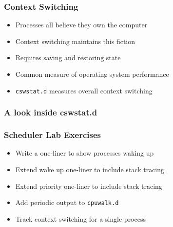 \documentclass[pdftex]{beamer}
\begin{document}
\begin{frame}[fragile]
  \frametitle{Context Switching}
  \begin{itemize}
  \item Processes all believe they own the computer
  \item Context switching maintains this fiction
  \item Requires saving and restoring state
  \item Common measure of operating system performance
  \item \verb+cswstat.d+ measures overall context switching
  \end{itemize}
\end{frame}

\begin{frame}
  \frametitle{A look inside cswstat.d}
  
\end{frame}

\begin{frame}[fragile]
  \frametitle{Scheduler Lab Exercises}
  \begin{itemize}
  \item Write a one-liner to show processes waking up
  \item Extend wake up one-liner to include stack tracing
  \item Extend priority one-liner to include stack tracing
  \item Add periodic output to \verb+cpuwalk.d+
  \item Track context switching for a single process
  \end{itemize}
\end{frame}
\end{document}
